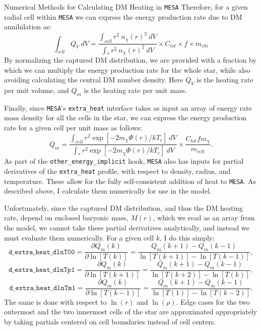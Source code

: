 \documentclass[a4paper,11pt]{article}
\begin{document}
\begin{section}{Numerical Methods for Calculating DM Heating in \texttt{MESA}}
    Therefore, for a given radial cell within \texttt{MESA} we can express the energy production rate due to DM annihilation as: 
    \begin{equation}
        \int_{cell} Q_{V} ~ dV = \frac{\int_{cell} r^2 ~n_{\chi}(r)^2~ dV}{\int_* r^2~ n_{\chi}(r)^2 ~dV} \times C_{tot} \times f \times m_{chi}
        \label{qm}
    \end{equation}
    By normalizing the captured DM distribution, we are provided with a fraction by which we can multiply the energy production rate for the whole star, while also avoiding calculating the central DM number density.
    Here $Q_V$ is the heating rate per unit volume, and $Q_m$ is the heating rate per unit mass.

    Finally, since \texttt{MESA}'s \texttt{extra\_heat} interface takes as input an array of energy rate mass density for all the cells in the star, we can express the energy production rate for a given cell per unit mass as follows: 
    \begin{equation}
        Q_m = \frac{\int_{cell} r^2 \exp[-2m_{\chi} \Phi(r) / kT_c]~dV}{\int_{*} r^2 \exp[-2m_{\chi} \Phi(r) / kT_c]~dV} \times \frac{C_{tot} f m_{\chi}}{m_{cell}}.
        \label{Qmpercell}
    \end{equation}
    As part of the \texttt{other\_energy\_implicit} hook, \texttt{MESA} also has inputs for partial derivatives of the \texttt{extra\_heat} profile, with respect to density, radius, and temperature. These allow for the fully self-consistent addition of heat to \texttt{MESA}.
    As described above, I calculate them numerically for use in the model.

    Unfortunately, since the captured DM distribution, and thus the DM heating rate, depend on enclosed baryonic mass, $M(r)$, which we read as an array from the model, we cannot take these partial derivatives analytically, and instead we must evaluate them numerically. 
    For a given cell $k$, I do this simply:
    \begin{equation}
        \texttt{d\_extra\_heat\_dlnT00} = \frac{\partial Q_{m}(k)}{\partial \ln[T(k)]} =
        \frac{Q_{m}(k+1) - Q_{m}(k-1)}{\ln[T(k+1)] - \ln[T(k-1)]} ,
    \end{equation}
    \begin{equation}
        \texttt{d\_extra\_heat\_dlnTp1} = \frac{\partial Q_{m}(k)}{\partial \ln[T(k+1)]} =
        \frac{Q_{m}(k+1) - Q_{m}(k-1)}{\ln[T(k+2)] - \ln[T(k)]} ,
    \end{equation}
    \begin{equation}
        \texttt{d\_extra\_heat\_dlnTm1} = \frac{\partial Q_{m}(k)}{\partial \ln[T(k-1)]} =
        \frac{Q_{m}(k+1) - Q_{m}(k-1)}{\ln[T(1)] - \ln[T(k-2)]}.
    \end{equation}
    The same is done with respect to $\ln(r)$ and $\ln(\rho)$.
    Edge cases for the two outermost and the two innermost cells of the star are approximated appropriately by taking partials centered on cell boundaries instead of cell centers.


\end{section}
\end{document}
